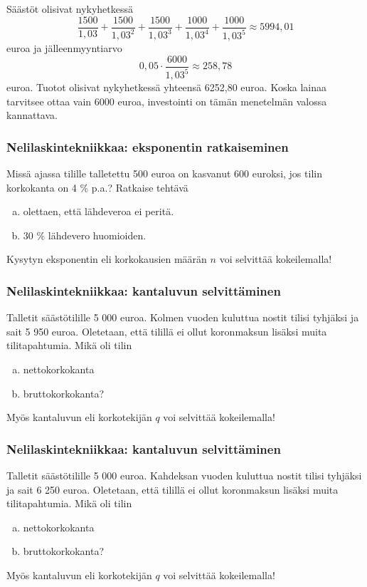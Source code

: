 \documentclass[]{beamer}
\begin{document}
\begin{frame}
    \begin{ratkaisu}
        Säästöt olisivat nykyhetkessä
        \[
            \frac{1500}{1,03} + \frac{1500}{1,03^2} + \frac{1500}{1,03^3} + \frac{1000}{1,03^4} + \frac{1000}{1,03^5}\approx 5994,01
       \]
       euroa ja jälleenmyyntiarvo
       \[
            0,05\cdot\frac{6000}{1,03^5}\approx 258,78
       \]
       euroa. Tuotot olisivat nykyhetkessä yhteensä 6252,80 euroa. Koska lainaa tarvitsee ottaa vain 6000 euroa,
       investointi on tämän menetelmän valossa kannattava.
    \end{ratkaisu}
\end{frame}

\begin{frame}
    \frametitle{Nelilaskintekniikkaa: eksponentin ratkaiseminen}
    \pause
    \begin{esim}
        Missä ajassa tilille talletettu 500 euroa on kasvanut 600 euroksi, jos tilin korkokanta on 4 \% p.a.?
        Ratkaise tehtävä
        \begin{enumerate}[(a)]
            \item olettaen, että lähdeveroa ei peritä.
            \item 30 \% lähdevero huomioiden.
        \end{enumerate}
    \end{esim}
    \pause
    Kysytyn eksponentin  eli korkokausien määrän $n$ voi selvittää kokeilemalla!
\end{frame}

\begin{frame}
    \frametitle{Nelilaskintekniikkaa: kantaluvun selvittäminen}
    \begin{esim}
        Talletit säästötilille 5 000 euroa. Kolmen vuoden kuluttua nostit tilisi tyhjäksi ja sait 5 950 euroa.
        Oletetaan, että tilillä ei ollut koronmaksun lisäksi muita tilitapahtumia. Mikä oli tilin
        \begin{enumerate}[(a)]
            \item nettokorkokanta
            \item bruttokorkokanta?
        \end{enumerate}
    \end{esim}
    \pause
    Myös kantaluvun eli korkotekijän $q$ voi selvittää kokeilemalla!
\end{frame}

\begin{frame}
    \frametitle{Nelilaskintekniikkaa: kantaluvun selvittäminen}
    \begin{esim}
        Talletit säästötilille 5 000 euroa. Kahdeksan vuoden kuluttua nostit tilisi tyhjäksi ja sait 6 250 euroa.
        Oletetaan, että tilillä ei ollut koronmaksun lisäksi muita tilitapahtumia. Mikä oli tilin
        \begin{enumerate}[(a)]
            \item nettokorkokanta
            \item bruttokorkokanta?
        \end{enumerate}
    \end{esim}
    \pause
    Myös kantaluvun eli korkotekijän $q$ voi selvittää kokeilemalla!
\end{frame}
\end{document}
